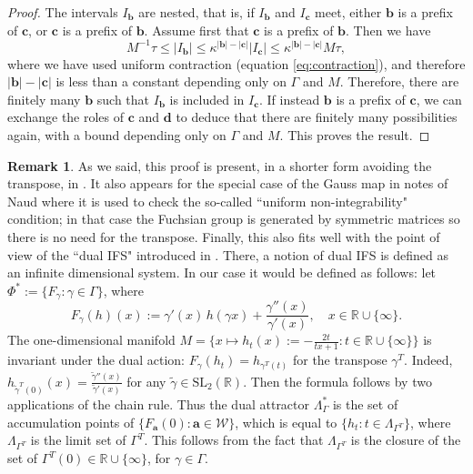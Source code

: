 \documentclass[12pt]{amsart}
\newcommand{\R}{\mathbb{R}}
\newcommand*\abs[1]{
	\left|#1\right|
}
\theoremstyle{definition}
\newtheorem*{rem}{Remark}
\renewcommand{\leq}{\leqslant}
\begin{document}
\begin{proof}
The intervals $I_\mathbf{b}$ are nested, that is, if $I_\mathbf{b}$ and $I_\mathbf{c}$ meet, either $\mathbf{b}$ is a prefix of $\mathbf{c}$, or $\mathbf{c}$ is a prefix of $\mathbf{b}$. Assume first that $\mathbf{c}$ is a prefix of $\mathbf{b}$. Then we have
\[M^{-1}\tau \leq \abs{I_{\mathbf{b}}} \leq \kappa^{\abs{\mathbf{b}}-\abs{\mathbf{c}}}\abs{I_\mathbf{c}} \leq \kappa^{\abs{\mathbf{b}}-\abs{\mathbf{c}}}M\tau,\]
where we have used uniform contraction (equation \eqref{eq:contraction}), and therefore $\abs{\mathbf{b}} - \abs{\mathbf{c}}$ is less than a constant depending only on $\Gamma$ and $M$. Therefore, there are finitely many $\mathbf{b}$ such that $I_\mathbf{b}$ is included in $I_\mathbf{c}$. If instead $\mathbf{b}$ is a prefix of $\mathbf{c}$, we can exchange the roles of $\mathbf{c}$ and $\mathbf{d}$ to deduce that there are finitely many possibilities again, with a bound depending only on $\Gamma$ and $M$. This proves the result.
\end{proof}

\begin{rem}
 As we said, this proof is present, in a shorter form avoiding the transpose, in \cite{BD}. It also appears for the special case of the Gauss map in notes of Naud \cite{Naud} where it is used to check the so-called ``uniform non-integrability" condition; in that case the Fuchsian group is generated by symmetric matrices so there is no need for the transpose. Finally, this also fits well with the point of view of the ``dual IFS" introduced in \cite{BKT}. There, a notion of dual IFS is defined as an infinite dimensional system. In our case it would be defined as follows: let $\Phi^* := \{F_\gamma : \gamma \in \Gamma\}$, where
$$F_\gamma(h)(x)
:=
\gamma'(x)\, h(\gamma x)
+
\frac{\gamma''(x)}{\gamma'(x)} , \quad x \in \mathbb{R} \cup \{\infty\}.
$$
The one-dimensional manifold $M = \{x \mapsto  h_t(x):=-\frac{2t}{tx+1}:t\in\mathbb R\cup\{\infty\} \}$ is invariant under the dual action: $F_\gamma(h_t)=h_{\gamma^T(t)}$ for the transpose $\gamma^T$. Indeed, $h_{\tilde{\gamma}^T(0)}(x) = \frac{\tilde{\gamma}''(x)}{\tilde{\gamma}'(x)}$ for any $\tilde{\gamma} \in \mathrm{SL}_2(\R)$. Then the formula follows by two applications of the chain rule. Thus the dual attractor $\Lambda_\Gamma^*$ is the set of accumulation points of $\{F_{\mathbf{a}}(0) : \mathbf{a} \in \mathcal{W}\}$, which is equal to $\{h_t : t \in \Lambda_{\Gamma^T}\}$, where $\Lambda_{\Gamma^T}$ is the limit set of $\Gamma^T$. This follows from the fact that $\Lambda_{\Gamma^T}$ is the closure of the set of $\Gamma^T(0) \in \R \cup \{\infty\}$, for $\gamma\in\Gamma$.
\end{rem}
\end{document}

